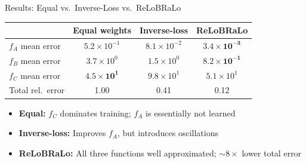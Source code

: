 \documentclass[aspectratio=169,11pt]{beamer}
\newcommand{\emphc}[1]{\textcolor{harvardcrimson}{#1}}
\begin{document}
\begin{frame}{Results: Equal vs.\ Inverse-Loss vs.\ ReLoBRaLo}
\begin{center}
\renewcommand{\arraystretch}{1.3}
{\small
\begin{tabular}{@{}lccc@{}}
\toprule
 & \textbf{Equal weights} & \textbf{Inverse-loss} & \textbf{ReLoBRaLo} \\
\midrule
$f_A$ mean error & $5.2 \times 10^{-1}$ & $8.1 \times 10^{-2}$ & $\bm{3.4 \times 10^{-3}}$ \\
$f_B$ mean error & $3.7 \times 10^{0}$ & $1.5 \times 10^{0}$ & $\bm{8.2 \times 10^{-1}}$ \\
$f_C$ mean error & $\bm{4.5 \times 10^{1}}$ & $9.8 \times 10^{1}$ & $5.1 \times 10^{1}$ \\
\midrule
Total rel.\ error & 1.00 & 0.41 & \emphc{0.12} \\
\bottomrule
\end{tabular}
}
\end{center}

\vspace{0.3cm}
\begin{itemize}
    \item \textbf{Equal:} $f_C$ dominates training; $f_A$ is essentially \emphc{not learned}
    \item \textbf{Inverse-loss:} Improves $f_A$, but introduces oscillations
    \item \textbf{ReLoBRaLo:} All three functions well approximated; $\sim 8\times$ lower total error
\end{itemize}
\end{frame}
\end{document}
